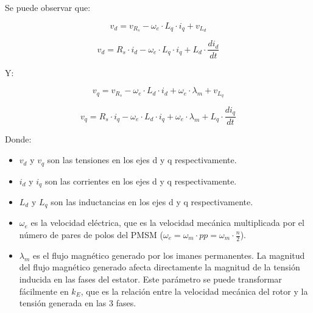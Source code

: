 Se puede observar que:

\begin{equation}
v_d = v_{R_s} - \omega_e \cdot L_q \cdot i_q + v_{L_d}
\end{equation}

\begin{equation}
v_d = R_s\cdot i_d - \omega_e \cdot L_q \cdot i_q + L_d\cdot\frac{d i_d}{d t}
\end{equation}

Y:

\begin{equation}
v_q = v_{R_s} - \omega_e \cdot L_d \cdot i_d + \omega_e \cdot \lambda_m + v_{L_q}
\end{equation}

\begin{equation}
v_q = R_s\cdot i_q - \omega_e \cdot L_d \cdot i_q + \omega_e \cdot \lambda_m + L_q\cdot\frac{d i_q}{d t}
\end{equation}

Donde:
\begin{itemize}
    \item \(v_d\) y \(v_q\) son las tensiones en los ejes d y q respectivamente.
    \item \(i_d\) y \(i_q\) son las corrientes en los ejes d y q respectivamente.
    \item \(L_d\) y \(L_q\) son las inductancias en los ejes d y q respectivamente.
    \item \(\omega_e\) es la velocidad eléctrica, que es la velocidad mecánica multiplicada por el número de pares de polos del PMSM (\(\omega_e = \omega_m \cdot pp = \omega_m \cdot \frac{n}{2}\)).
    \item \(\lambda_m\) es el flujo magnético generado por los imanes permanentes. La magnitud del flujo magnético generado afecta directamente la magnitud de la tensión inducida en las fases del estator. Este parámetro se puede transformar fácilmente en \(k_E\), que es la relación entre la velocidad mecánica del rotor y la tensión generada en las 3 fases.
\end{itemize}


